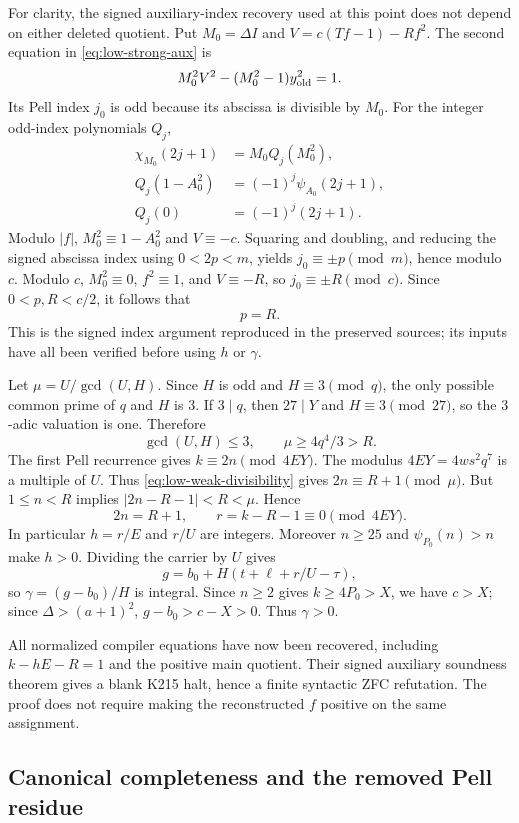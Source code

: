 For clarity, the signed auxiliary-index recovery used at this point does
not depend on either deleted quotient.  Put $M_0=\Delta I$ and
$V=c(Tf-1)-Rf^2$.  The second equation in \eqref{eq:low-strong-aux} is
\[
 M_0^2V^2-(M_0^2-1)y_{\rm old}^2=1.
\]
Its Pell index $j_0$ is odd because its abscissa is divisible by $M_0$.
For the integer odd-index polynomials $Q_j$,
\begin{align*}
 \chi_{M_0}(2j+1)&=M_0Q_j(M_0^2),\\
 Q_j(1-A_0^2)&=(-1)^j\psi_{A_0}(2j+1),\\
 Q_j(0)&=(-1)^j(2j+1).
\end{align*}
Modulo $|f|$, $M_0^2\equiv1-A_0^2$ and $V\equiv-c$.  Squaring and
doubling, and reducing the signed abscissa index using $0<2p<m$, yields
$j_0\equiv\pm p\pmod m$, hence modulo $c$.  Modulo $c$,
$M_0^2\equiv0$, $f^2\equiv1$, and $V\equiv-R$, so
$j_0\equiv\pm R\pmod c$.  Since $0<p,R<c/2$, it follows that
\begin{equation}
 p=R.
 \label{eq:low-index}
\end{equation}
This is the signed index argument reproduced in the preserved sources;
its inputs have all been verified before using $h$ or $\gamma$.

Let $\mu=U/\gcd(U,H)$.  Since $H$ is odd and $H\equiv3\pmod q$, the
only possible common prime of $q$ and $H$ is $3$.  If $3\mid q$, then
$27\mid Y$ and $H\equiv3\pmod{27}$, so the $3$-adic valuation is one.
Therefore
\[
 \gcd(U,H)\le3,\qquad \mu\ge4q^4/3>R.
\]
The first Pell recurrence gives $k\equiv2n\pmod{4EY}$.  The modulus
$4EY=4ws^2q^7$ is a multiple of $U$.  Thus
\eqref{eq:low-weak-divisibility} gives $2n\equiv R+1\pmod\mu$.
But $1\le n<R$ implies $|2n-R-1|<R<\mu$.  Hence
\[
 2n=R+1,\qquad r=k-R-1\equiv0\pmod{4EY}.
\]
In particular $h=r/E$ and $r/U$ are integers.  Moreover $n\ge25$ and
$\psi_{P_0}(n)>n$ make $h>0$.  Dividing the carrier by $U$ gives
\[
 g=b_0+H(t+\ell+r/U-\tau),
\]
so $\gamma=(g-b_0)/H$ is integral.  Since $n\ge2$ gives
$k\ge4P_0>X$, we have $c>X$; since $\Delta>(a+1)^2$,
$g-b_0>c-X>0$.  Thus $\gamma>0$.

All normalized compiler equations have now been recovered, including
$k-hE-R=1$ and the positive main quotient.  Their signed auxiliary
soundness theorem gives a blank K215 halt, hence a finite syntactic ZFC
refutation.  The proof does not require making the reconstructed $f$
positive on the same assignment.

\subsection{Canonical completeness and the removed Pell residue}

